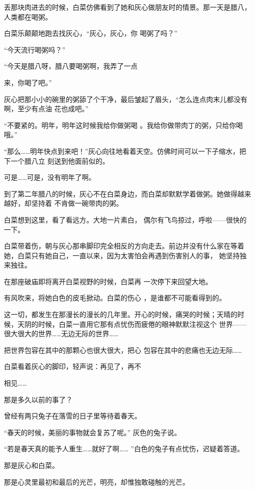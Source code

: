 \documentclass{article}
\begin{document}
丢那块肉进去的时候，白菜仿佛看到了她和灰心做朋友时的情景。那一天是腊八，人类都在喝粥。

白菜乐颠颠地跑去找灰心，“灰心，灰心，你
喝粥了吗？” 


“今天流行喝粥吗？” 

“今天是腊八呀，腊八要喝粥啊，我弄了一点

\newpage
来，你喝了吧。” 

灰心把那小小的碗里的粥舔了个干净，最后皱起了眉头，“怎么连点肉末儿都没有啊，至少有点油
花也成吧。” 

“不要紧的。明年，明年这时候我给你做粥喝
。我给你做带肉丁的粥，只给你喝哦。” 

“那么……明年快点到来吧！”灰心向往地看着天空。仿佛时间可以一下子缩水，把下一个腊八立
刻送到他面前似的。 


可是……可是，没有明年了啊。 

到了第二年腊八的时候，灰心不在白菜身边，而白菜却默默学着做粥。她做得越来越好，却坚持着
不肯做一碗带肉的粥。 

白菜想到这里，看了看远方。大地一片素白，
偶尔有飞鸟掠过，呼啦——很快的一下。 

\newpage

白菜带着伤，朝与灰心那串脚印完全相反的方向走去。前边并没有什么家在等着她，白菜只有她自己，一直以来，因为太害怕会再遇到伤害别人的事，
她坚持独来独往。 

在那座破庙即将离开白菜视野的时候，白菜再
一次停下来回望大地。 

有风吹来，将她白色的皮毛掀动。白菜的伤心
，是谁都不可能看得到的。 

这一切，都发生在那漫长的漫长的几年里。开心的时候，痛哭的时候；天晴的时候，天阴的时候，白菜一直用它那有点忧伤而疲倦的眼神默默注视这个
世界——很大很大的世界……无边无际的世界…… 

把世界包容在其中的那颗心也很大很大，把心
包容在其中的悲痛也无边无际…… 

白菜看着灰心的脚印，轻声说：再见了，再不

\newpage
相见…… 


那是多久以前的事了？ 

曾经有两只兔子在落雪的日子里等待着春天。

“春天的时候，美丽的事物就会复苏了呢。”
灰色的兔子说。 

“若是春天真的能予人重生……就好了啊……
”白色的兔子有点忧伤，迟疑着答道。 


那是灰心和白菜。 

那是心灵里最初和最后的光芒，明亮，却惟独敢碰触的光芒。
\end{document}
